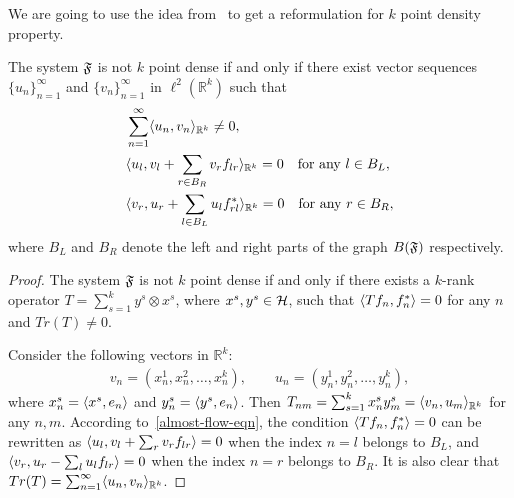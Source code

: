 \documentclass[12pt,oneside,a4paper]{amsart}
\begin{document}
      We are going to use the idea from~\cite{me} to get a reformulation for $k$ point density property.
      \begin{prop}
        \label{prop-vec-est}
        The system $\fsys$ is not $k$ point dense if and only if there exist vector sequences
          $\{u_n\}_{n=1}^\infty$ and $\{v_n\}_{n=1}^\infty$ in $\ell^2 (\mathbb{R}^k)$ such that
        \begin{align*}
          &\sum_{n=1}^\infty \inner{u_n}{v_n}_{\mathbb{R}^k} \neq 0,\\
          &\inner{u_l}{v_l + \sum_{r \in B_R} v_r f_{lr}}_{\mathbb{R}^k} = 0 \quad \text{for any $l \in B_L$},\\
          &\inner{v_r}{u_r + \sum_{l \in B_L} u_l f_{rl}^*}_{\mathbb{R}^k} = 0 \quad \text{for any $r \in B_R$},
        \end{align*}
        where $B_L$ and $B_R$ denote the left and right parts of the graph $B(\fsys)$ respectively.
      \end{prop}
      \begin{proof}
        The system $\fsys$ is not $k$ point dense if and only if there exists a $k$-rank operator $T = \sum_{s=1}^k y^s \otimes x^s$, where $x^s, y^s \in \cal{H}$, such that $\inner{Tf_n}{f_n^*} = 0$ for any $n$ and $Tr(T) \neq 0$.

        Consider the following vectors in $\mathbb{R}^k$:
        \begin{align*}
          v_n = (x^1_n, x^2_n, \dots, x^k_n),\qquad
          u_n = (y^1_n, y^2_n, \dots, y^k_n),
        \end{align*}
          where $x^s_n = \inner{x^s}{e_n}$ and $y^s_n = \inner{y^s}{e_n}$.
        Then $T_{nm} = \sum_{s=1}^k  x^s_n y^s_m = \inner{v_n}{u_m}_{\mathbb{R}^k}$ for any $n, m$.
        According to~\eqref{almost-flow-eqn}, the condition $\inner{Tf_n}{f^*_n} = 0$ can be rewritten as
          $\inner{u_l}{v_l + \sum_r v_r f_{lr}} = 0$
        when the index $n=l$ belongs to $B_L$, and
          $\inner{v_r}{u_r - \sum_l u_l f_{lr}} = 0$
        when the index $n=r$ belongs to $B_R$.
        It is also clear that
          $Tr(T) = \sum_{n=1}^\infty \inner{u_n}{v_n}_{\mathbb{R}^k}$. 
      \end{proof}
\end{document}
